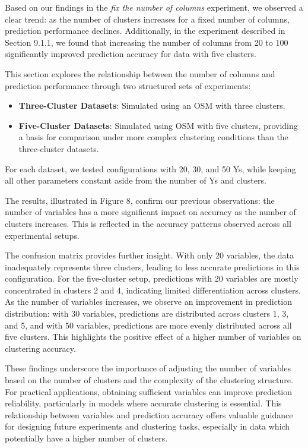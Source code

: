 \documentclass{article}
\begin{document}
Based on our findings in the \textit{fix the number of columns} experiment, we observed a clear trend: as the number of clusters increases for a fixed number of columns, prediction performance declines. Additionally, in the experiment described in Section 9.1.1, we found that increasing the number of columns from 20 to 100 significantly improved prediction accuracy for data with five clusters.

This section explores the relationship between the number of columns and prediction performance through two structured sets of experiments:

\begin{itemize}
    \item \textbf{Three-Cluster Datasets}: Simulated using an OSM with three clusters.
    \item \textbf{Five-Cluster Datasets}: Simulated using OSM with five clusters, providing a basis for comparison under more complex clustering conditions than the three-cluster datasets.
\end{itemize}

For each dataset, we tested configurations with 20, 30, and 50 Ys, while keeping all other parameters constant aside from the number of Ys and clusters.

The results, illustrated in Figure 8, confirm our previous observations: the number of variables has a more significant impact on accuracy as the number of clusters increases. This is reflected in the accuracy patterns observed across all experimental setups.

The confusion matrix provides further insight. With only 20 variables, the data inadequately represents three clusters, leading to less accurate predictions in this configuration. For the five-cluster setup, predictions with 20 variables are mostly concentrated in clusters 2 and 4, indicating limited differentiation across clusters. As the number of variables increases, we observe an improvement in prediction distribution: with 30 variables, predictions are distributed across clusters 1, 3, and 5, and with 50 variables, predictions are more evenly distributed across all five clusters. This highlights the positive effect of a higher number of variables on clustering accuracy.

These findings underscore the importance of adjusting the number of variables based on the number of clusters and the complexity of the clustering structure. For practical applications, obtaining sufficient variables can improve prediction reliability, particularly in models where accurate clustering is essential. This relationship between variables and prediction accuracy offers valuable guidance for designing future experiments and clustering tasks, especially in data which potentially have a higher number of clusters.
\end{document}
